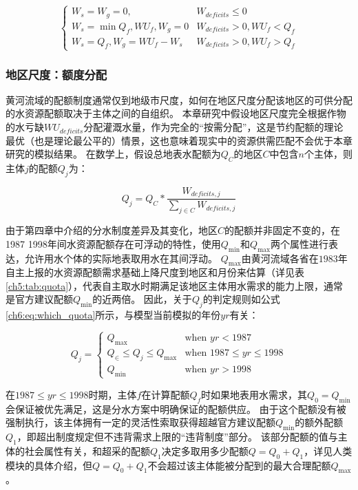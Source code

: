 \begin{equation}
    \label{ch6:eq:wu}
    \begin{cases}
        W_s = W_g = 0, & W_{deficits} \leq 0 \\
        W_s = \min{Q_f, WU_f}, W_g = 0 & W_{deficits} > 0, WU_f < Q_f \\
        W_s = Q_f, W_g = WU_f - W_s & W_{deficits} > 0, WU_f > Q_f
    \end{cases}
\end{equation}

\subsubsection{地区尺度：额度分配}

黄河流域的配额制度通常仅到地级市尺度，如何在地区尺度分配该地区的可供分配的水资源配额取决于主体之间的自组织。
本章研究中假设地区尺度完全根据作物的水亏缺$WU_{deficits}$分配灌溉水量，作为完全的“按需分配”，这是节约配额的理论最优（也是理论最公平的）情景，这也意味着现实中的资源供需匹配不会优于本章研究的模拟结果。
在数学上，假设总地表水配额为$Q_{C}$的地区$C$中包含$n$个主体，则主体$j$的配额$Q_j$为：

\begin{equation}
    \label{ch6:eq:quota}
    Q_j = Q_{C} * \frac{W_{deficits, j}}{\sum_{j \in C} W_{deficits, j}}
\end{equation}

由于第四章中介绍的分水制度差异及其变化，地区$C$的配额并非固定不变的，在1987 \textendash{} 1998年间水资源配额存在可浮动的特性，使用$Q_{\min}$和$Q_{\max}$两个属性进行表达，允许用水个体的实际地表取用水在其间浮动。
$Q_{\max}$由黄河流域各省在$1983$年自主上报的水资源配额需求基础上降尺度到地区和月份来估算（详见表\ref{ch5:tab:quota}），代表自主取水时期满足该地区主体用水需求的能力上限，通常是官方建议配额$Q_{\min}$的近两倍。
因此，关于$Q_j$的判定规则如公式\ref{ch6:eq:which_quota}所示，与模型当前模拟的年份$yr$有关：

\begin{equation}
    \label{ch6:eq:which_quota}
    Q_j =
    \begin{cases}
        Q_{\max} & \text{when } yr < 1987 \\
        Q_{\in} \leq Q_j \leq Q_{\max} & \text{when } 1987 \leq yr \leq 1998 \\
        Q_{\min} & \text{when } yr > 1998
    \end{cases}
\end{equation}

在$1987 \leq yr \leq 1998$时期，主体$f$在计算配额$Q_f$时如果地表用水需求，其$Q_{0} = Q_{\min}$会保证被优先满足，这是分水方案中明确保证的配额供应。
由于这个配额没有被强制执行，该主体拥有一定的灵活性索取获得超越官方建议配额$Q_{\min}$的额外配额$Q_{1}$，即超出制度规定但不违背需求上限的“违背制度”部分。
该部分配额的值与主体的社会属性有关，和超采的配额$Q_{1}$决定多取用多少配额$Q = Q_{0} + Q_{1}$，详见人类模块的具体介绍，但$Q = Q_{0} + Q_{1}$不会超过该主体能被分配到的最大合理配额$Q_{\max}$。

